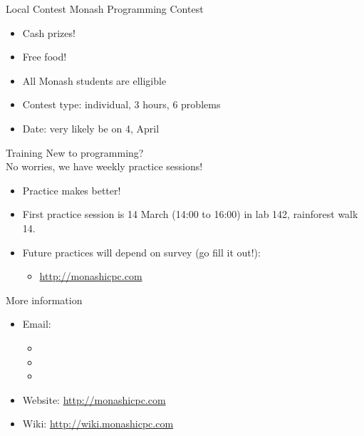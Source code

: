 \documentclass{beamer}
\begin{document}
\begin{frame}{Local Contest}
  Monash Programming Contest
  \begin{itemize}
    \item Cash prizes!
    \item Free food!
    \item All Monash students are elligible
    \item Contest type: individual, 3 hours, 6 problems
    \item Date: very likely be on 4, April
  \end{itemize}
\end{frame}

\begin{frame}{Training}
  New to programming?\\No worries, we have weekly practice sessions!
  \begin{itemize}
    \item Practice makes  better! 
    \item First practice session is 14 March (14:00 to 16:00) in lab 142, rainforest walk 14.
    \item Future practices will depend on survey (go fill it out!):
      \begin{itemize}
          \item \url{http://monashicpc.com}
      \end{itemize}
  \end{itemize}
\end{frame}

\begin{frame}{More information}
  \begin{itemize}
    \item Email: 
      \begin{itemize}
        \item {}
        \item {}
        \item {}
      \end{itemize}
    \item Website: \url{http://monashicpc.com}
    \item Wiki: \url{http://wiki.monashicpc.com}
  \end{itemize}
\end{frame}
\end{document}
